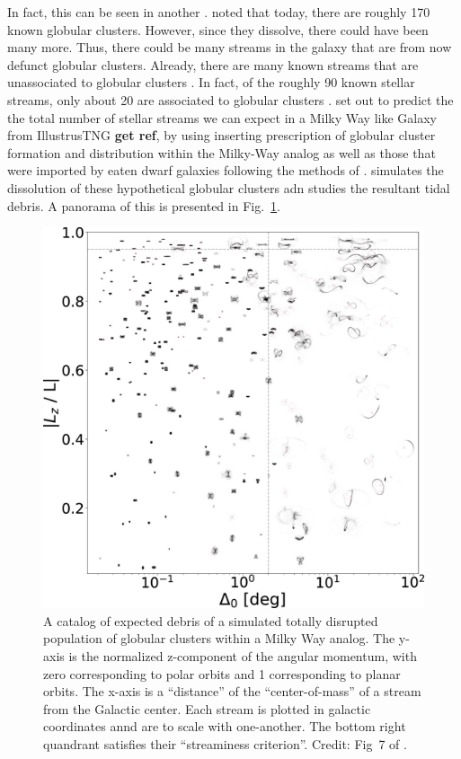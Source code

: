             In fact, this can be seen in another \citet{2024ApJ...976...54P}. \citet{2024ApJ...976...54P} noted that today, there are roughly 170 known globular clusters. However, since they dissolve, there could have been many more. Thus, there could be many streams in the galaxy that are from now defunct globular clusters. Already, there are many known streams that are unassociated to globular clusters \citep{2022ApJ...926..107M}. In fact, of the roughly 90 known stellar streams, only about 20 are associated to globular clusters \citep{2024ApJ...967...89I}. \citet{2024ApJ...976...54P} set out to predict the the total number of stellar streams we can expect in a Milky Way like Galaxy from IllustrusTNG \textbf{get ref}, by using inserting prescription of globular cluster formation and distribution within the Milky-Way analog as well as those that were imported by eaten dwarf galaxies following the methods of \citet{2022MNRAS.514.4736C,2023MNRAS.522.5638C}. \citet{2024ApJ...976...54P} simulates the dissolution of these hypothetical globular clusters adn studies the resultant tidal debris. A panorama of this is presented in Fig.~\ref{fig:perason-2024-fig}. 

            \begin{figure}
                \includegraphics[width=\linewidth]{images/perason-2024-fig.jpg}
                \caption{A catalog of expected debris of a simulated totally disrupted population of globular clusters within a Milky Way analog. The y-axis is the normalized z-component of the angular momentum, with zero corresponding to polar orbits and 1 corresponding to planar orbits. The x-axis is a ``distance'' of the ``center-of-mass'' of a stream from the Galactic center. Each stream is plotted in galactic coordinates annd are to scale with one-another. The bottom right quandrant satisfies their ``streaminess criterion''. Credit: Fig~7 of  \citet{2024ApJ...976...54P}.}
                \label{fig:perason-2024-fig}
            \end{figure}

